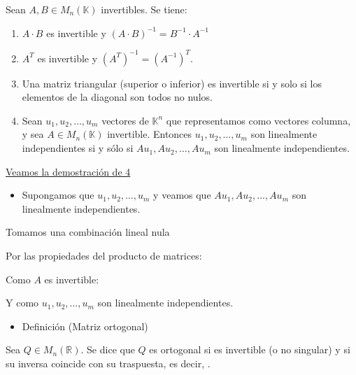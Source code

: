 \documentclass[12pt]{article}
\begin{document}
Sean $A,B\in M_n(\mathbb{K})$ invertibles. Se tiene:

\begin{enumerate}
\item $A\cdot B$ es invertible y $(A\cdot B)^{-1}=B^{-1}\cdot
A^{-1}$
    \item $A^T$ es invertible y $(A^T)^{-1}=(A^{-1})^T$.
\item Una matriz triangular (superior o inferior) es invertible
si y solo si los elementos de la diagonal son todos no nulos.
\item Sean $u_1,u_2,\hdots,u_m$ vectores de $\mathbb{K}^n$ que
representamos como vectores columna, y sea $A\in
M_n(\mathbb{K})$ invertible. Entonces $u_1,u_2,\hdots,u_m$ son
linealmente independientes si y sólo si $Au_1,Au_2,\hdots,Au_m$
son linealmente independientes.
\end{enumerate}
\underline{Veamos la demostración de 4}
\begin{itemize}[label=$\longrightarrow$]
\item Supongamos que $u_1,u_2,\hdots,u_m$ y veamos que
$Au_1,Au_2,\hdots,Au_m$ son linealmente independientes.
\end{itemize}
Tomamos una combinación lineal nula


Por las propiedades del producto de matrices:


Como $A$ es invertible:


Y como $u_1,u_2,\hdots,u_m$ son linealmente independientes.


\begin{itemize}[label=\color{red}\textbullet, leftmargin=*]
    \item \color{lightblue} Definición (Matriz ortogonal)
\end{itemize}
Sea $Q\in M_n(\mathbb{R})$. Se dice que $Q$ es ortogonal si es
invertible (o no singular) y si su inversa coincide con su
traspuesta, es decir,
.
\end{document}
